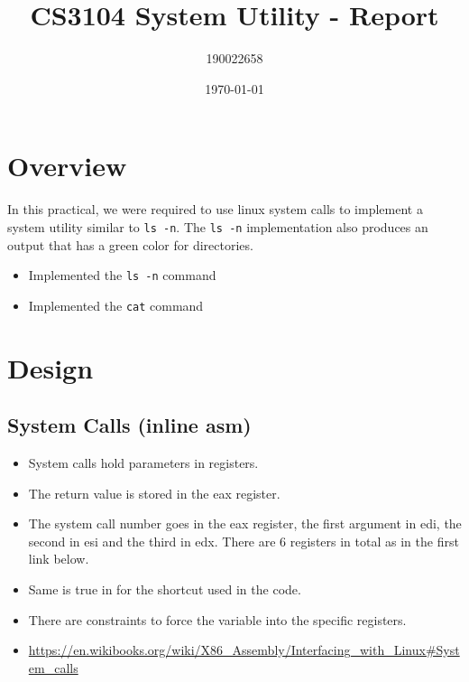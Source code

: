 \documentclass[11pt]{article}
\author{190022658}
\date{\today}
\title{CS3104 System Utility - Report}
\begin{document}
\maketitle

\section{Overview}
\label{sec:orgbe92360}
In this practical, we were required to use linux system calls to implement a system utility similar to \texttt{ls -n}. The \texttt{ls -n} implementation also produces an output that has a green color for directories.

\begin{itemize}
\item Implemented the \texttt{ls -n} command
\item Implemented the \texttt{cat} command
\end{itemize}


\section{Design}
\label{sec:orgd32be05}
\subsection{System Calls (inline asm)}
\label{sec:org9e08fd3}
\begin{itemize}
\item System calls hold parameters in registers.
\item The return value is stored in the eax register.
\item The system call number goes in the eax register, the first argument in edi, the second in esi and the third in edx. There are 6 registers in total as in the first link below.
\item Same is true in for the shortcut used in the code.
\item There are constraints to force the variable into the specific registers.

\item \url{https://en.wikibooks.org/wiki/X86\_Assembly/Interfacing\_with\_Linux\#System\_calls}
\end{itemize}
\end{document}
